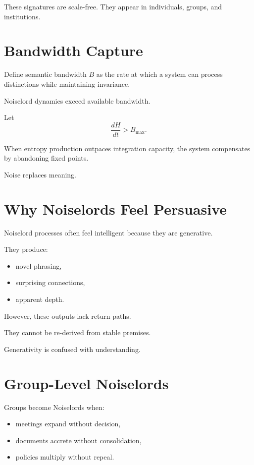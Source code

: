 \documentclass[11pt]{book}
\begin{document}
These signatures are scale-free.
They appear in individuals, groups, and institutions.

\section{Bandwidth Capture}

Define semantic bandwidth \(B\) as the rate at which a system can process
distinctions while maintaining invariance.

Noiselord dynamics exceed available bandwidth.

Let
\[
\frac{dH}{dt} > B_{\max}.
\]

When entropy production outpaces integration capacity, the system compensates by
abandoning fixed points.

Noise replaces meaning.

\section{Why Noiselords Feel Persuasive}

Noiselord processes often feel intelligent because they are generative.

They produce:

\begin{itemize}
\item novel phrasing,
\item surprising connections,
\item apparent depth.
\end{itemize}

However, these outputs lack return paths.

They cannot be re-derived from stable premises.

Generativity is confused with understanding.

\section{Group-Level Noiselords}

Groups become Noiselords when:

\begin{itemize}
\item meetings expand without decision,
\item documents accrete without consolidation,
\item policies multiply without repeal.
\end{itemize}
\end{document}
